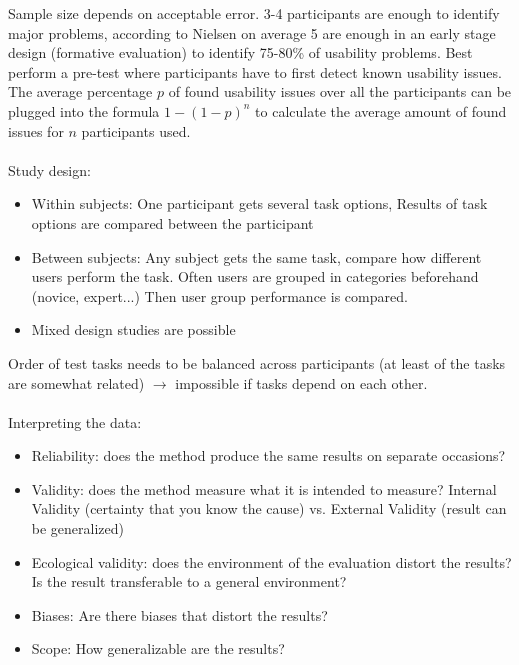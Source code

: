 Sample size depends on acceptable error. 3-4 participants are enough to identify major problems, according to Nielsen on average 5 are enough in an early stage design (formative evaluation) to identify 75-80\% of usability problems.
Best perform a pre-test where participants have to first detect known usability issues. The average percentage $p$ of found usability issues over all the participants can be plugged into the formula $1-(1-p)^n$ to calculate the average amount of found issues for $n$ participants used.\\\\
Study design:
\begin{itemize}
\item Within subjects: One participant gets several task options, Results of task options are compared between the participant
\item Between subjects: Any subject gets the same task, compare how different users perform the task. Often users are grouped in categories beforehand (novice, expert...) Then user group performance is compared.
\item Mixed design studies are possible
\end{itemize}
Order of test tasks needs to be balanced across participants (at least of the tasks are somewhat related) $\rightarrow$ impossible if tasks depend on each other.\\\\
Interpreting the data: 
\begin{itemize}
\item Reliability: does the method produce the same results on separate occasions?
\item Validity: does the method measure what it is intended to measure? Internal Validity (certainty that you know the cause) vs. External Validity (result can be generalized)
\item Ecological validity: does the environment of the evaluation distort the results? Is the result transferable to a general environment?
\item Biases: Are there biases that distort the results?
\item Scope: How generalizable are the results?
\end{itemize}

